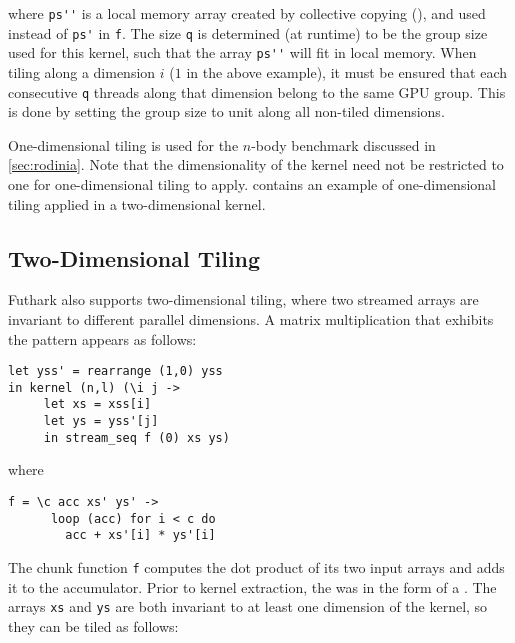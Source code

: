 \noindent where \lstinline{ps''} is a local memory array created by
collective copying (), and used instead of \lstinline{ps'}
in \lstinline{f}.  The size \lstinline{q} is determined (at runtime)
to be the group size used for this kernel, such that the array
\lstinline{ps''} will fit in local memory.  When tiling along a
dimension $i$ ($1$ in the above example), it must be ensured that each
consecutive \lstinline{q} threads along that dimension belong to the
same GPU group.  This is done by setting the group size to unit along
all non-tiled dimensions.

One-dimensional tiling is used for the $n$-body benchmark discussed in
\cref{sec:rodinia}.  Note that the dimensionality of the kernel need
not be restricted to one for one-dimensional tiling to apply.
 contains an example of one-dimensional tiling
applied in a two-dimensional kernel.

\subsection{Two-Dimensional Tiling}
\label{sec:two-dimensional-tiling}

Futhark also supports two-dimensional tiling, where two streamed
arrays are invariant to different parallel dimensions.  A matrix
multiplication that exhibits the pattern appears as follows:

\begin{lstlisting}
let yss' = rearrange (1,0) yss
in kernel (n,l) (\i j ->
     let xs = xss[i]
     let ys = yss'[j]
     in stream_seq f (0) xs ys)
\end{lstlisting}
\begin{minipage}[t]{0.1\linewidth}
  \begin{flushright}
    where
  \end{flushright}
\end{minipage}
\begin{minipage}[t]{0.8\linewidth}
\lstinline{f = \c acc xs' ys' ->}\\
\lstinline{      loop (acc) for i < c do}\\
\lstinline{        acc + xs'[i] * ys'[i]}
\end{minipage}
\vspace{1em}

The chunk function \lstinline{f} computes the dot product of its two
input arrays and adds it to the accumulator.  Prior to kernel
extraction, the \StreamSeq{} was in the form of a .  The
arrays \lstinline{xs} and \lstinline{ys} are both invariant to at
least one dimension of the kernel, so they can be tiled as follows:

